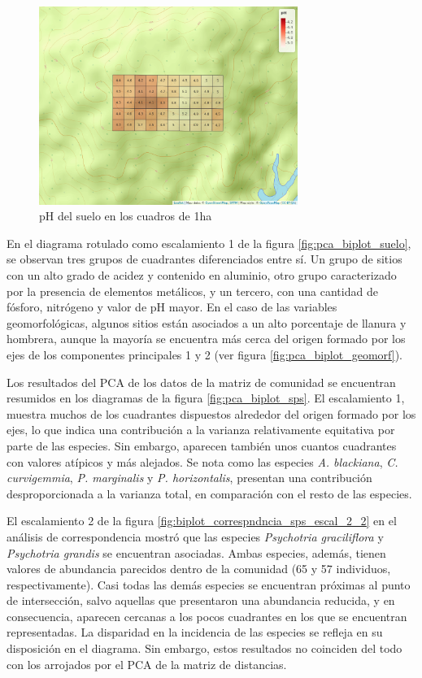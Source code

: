 \documentclass[11pt,]{article}
\begin{document}
\begin{figure}
\centering
\includegraphics[width=0.75000\textwidth]{mapa_cuadros_ph.png}
\caption{pH del suelo en los cuadros de 1ha \label{fig:mapa_cuadros_ph}}
\end{figure}

En el diagrama rotulado como escalamiento 1 de la figura
\ref{fig:pca_biplot_suelo}, se observan tres grupos de cuadrantes
diferenciados entre sí. Un grupo de sitios con un alto grado de acidez y
contenido en aluminio, otro grupo caracterizado por la presencia de
elementos metálicos, y un tercero, con una cantidad de fósforo,
nitrógeno y valor de pH mayor. En el caso de las variables
geomorfológicas, algunos sitios están asociados a un alto porcentaje de
llanura y hombrera, aunque la mayoría se encuentra más cerca del origen
formado por los ejes de los componentes principales 1 y 2 (ver figura
\ref{fig:pca_biplot_geomorf}).

Los resultados del PCA de los datos de la matriz de comunidad se
encuentran resumidos en los diagramas de la figura
\ref{fig:pca_biplot_sps}. El escalamiento 1, muestra muchos de los
cuadrantes dispuestos alrededor del origen formado por los ejes, lo que
indica una contribución a la varianza relativamente equitativa por parte
de las especies. Sin embargo, aparecen también unos cuantos cuadrantes
con valores atípicos y más alejados. Se nota como las especies \emph{A.
blackiana}, \emph{C. curvigemmia}, \emph{P. marginalis} y \emph{P.
horizontalis}, presentan una contribución desproporcionada a la varianza
total, en comparación con el resto de las especies.

El escalamiento 2 de la figura
\ref{fig:biplot_correspndncia_sps_escal_2_2} en el análisis de
correspondencia mostró que las especies \emph{Psychotria graciliflora} y
\emph{Psychotria grandis} se encuentran asociadas. Ambas especies,
además, tienen valores de abundancia parecidos dentro de la comunidad
(65 y 57 individuos, respectivamente). Casi todas las demás especies se
encuentran próximas al punto de intersección, salvo aquellas que
presentaron una abundancia reducida, y en consecuencia, aparecen
cercanas a los pocos cuadrantes en los que se encuentran representadas.
La disparidad en la incidencia de las especies se refleja en su
disposición en el diagrama. Sin embargo, estos resultados no coinciden
del todo con los arrojados por el PCA de la matriz de distancias.
\end{document}
